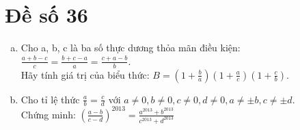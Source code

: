 \section{Đề số 36}

\begin{bt} 
	\hfill
	\begin{enumerate}[a.]
		\item Cho a, b, c là ba số thực dương thỏa mãn điều kiện: $\frac{a+b-c}{c}=\frac{b+c-a}{a}=\frac{c+a-b}{b}$. \\[5px]Hãy tính giá trị của biểu thức: $B=\left(1+\frac{b}{a}\right)\left(1+\frac{a}{c}\right)\left(1+\frac{c}{b}\right)$.
		\item Cho tỉ lệ thức $\frac{a}{b}=\frac{c}{d}$ với $a \neq 0, b \neq 0, c \neq 0, d \neq 0, a \neq \pm b, c \neq \pm d$.
		\\[5px]Chứng minh: $\left(\frac{a-b}{c-d}\right)^{2013}=\frac{a^{2013}+b^{2013}}{c^{2013}+d^{2013}}$
	\end{enumerate}
	

\end{bt}
